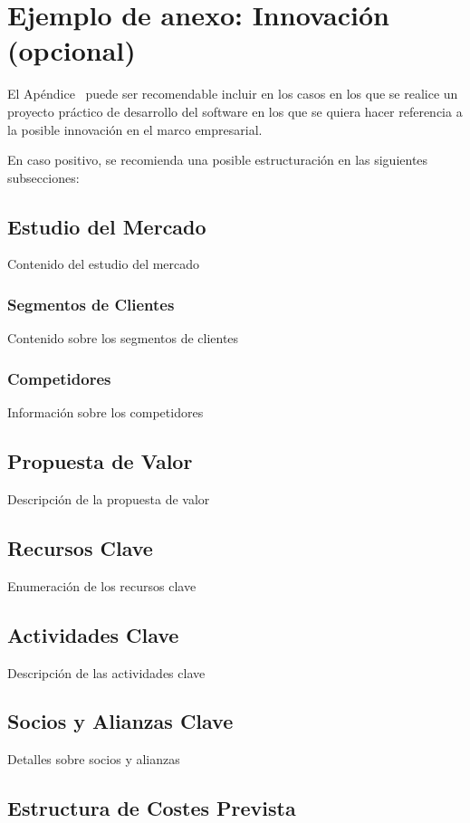\chapter{Ejemplo de anexo: Innovación (opcional)}

El Apéndice \thechapter\  puede ser recomendable incluir en los casos en los que se realice un proyecto práctico de desarrollo del software en los que se quiera hacer referencia a la posible innovación en el marco empresarial.

En caso positivo, se recomienda una posible estructuración en las siguientes subsecciones:

\section{Estudio del Mercado}
Contenido del estudio del mercado

\subsection{Segmentos de Clientes}
Contenido sobre los segmentos de clientes

\subsection{Competidores}
Información sobre los competidores

\section{Propuesta de Valor}
Descripción de la propuesta de valor

\section{Recursos Clave}
Enumeración de los recursos clave

\section{Actividades Clave}
Descripción de las actividades clave

\section{Socios y Alianzas Clave}
Detalles sobre socios y alianzas

\section{Estructura de Costes Prevista}

